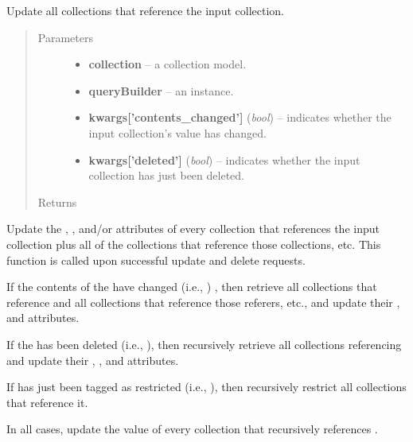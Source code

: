 \documentclass[letterpaper,10pt,english]{sphinxmanual}
\begin{document}
\begin{fulllineitems}
\label{api:onlinelinguisticdatabase.controllers.oldcollections.updateCollectionsThatReferenceThisCollection}
Update all collections that reference the input collection.
\begin{quote}\begin{description}
\item[{Parameters}] \leavevmode\begin{itemize}
\item {} 
\textbf{collection} -- a collection model.

\item {} 
\textbf{queryBuilder} -- an  instance.

\item {} 
\textbf{kwargs{[}'contents\_changed'{]}} (\emph{bool}) -- indicates whether the input
collection's  value has changed.

\item {} 
\textbf{kwargs{[}'deleted'{]}} (\emph{bool}) -- indicates whether the input collection has
just been deleted.

\end{itemize}

\item[{Returns}] \leavevmode
{}

\end{description}\end{quote}

Update the , ,  and/or 
attributes of every collection that references the input collection plus all
of the collections that reference those collections, etc.  This function is
called upon successful update and delete requests.

If the contents of the  have changed (i.e.,
) , then retrieve all collections
that reference  and all collections that reference those
referers, etc., and update their ,  and
 attributes.

If the  has been deleted (i.e., ),
then recursively retrieve all collections referencing  and
update their , ,  and 
attributes.

If  has just been tagged as restricted (i.e.,
), then recursively restrict all collections
that reference it.

In all cases, update the  value of every collection that
recursively references .

\end{fulllineitems}
\end{document}
